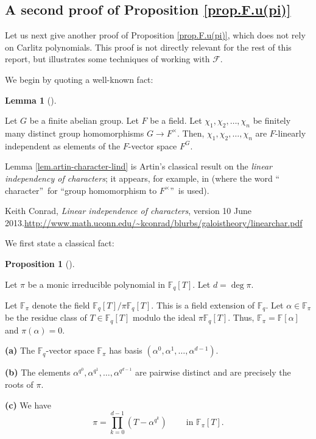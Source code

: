 \documentclass[numbers=enddot,12pt,final,onecolumn,notitlepage]{scrartcl}%
\theoremstyle{definition}
\newtheorem{lem}[theo]{Lemma}
\newenvironment{lemma}[1][]
{\begin{lem}[#1]\begin{leftbar}}
{\end{leftbar}\end{lem}}
\newtheorem{prop}[theo]{Proposition}
\newenvironment{proposition}[1][]
{\begin{prop}[#1]\begin{leftbar}}
{\end{leftbar}\end{prop}}
\newenvironment{noncompile}{}{}
\let\prodnonlimits\prod
\renewcommand{\prod}{\prodnonlimits\limits}
\begin{document}
\subsection{A second proof of Proposition \ref{prop.F.u(pi)}}

Let us next give another proof of Proposition \ref{prop.F.u(pi)}, which does
not rely on Carlitz polynomials. This proof is not directly relevant for the
rest of this report, but illustrates some techniques of working with
$\mathcal{F}$.

\begin{noncompile}
We begin by quoting a well-known fact:

\begin{lemma}
\label{lem.artin-character-lind}Let $G$ be a finite abelian group. Let $F$ be
a field. Let $\chi_{1},\chi_{2},\ldots,\chi_{n}$ be finitely many distinct
group homomorphisms $G\rightarrow F^{\times}$. Then, $\chi_{1},\chi_{2}%
,\ldots,\chi_{n}$ are $F$-linearly independent as elements of the $F$-vector
space $F^{G}$.
\end{lemma}

Lemma \ref{lem.artin-character-lind} is Artin's classical result on the
\textit{linear independency of characters}; it appears, for example, in
\cite[Theorem 2.1]{kc-lind} (where the word \textquotedblleft
character\textquotedblright\ for \textquotedblleft group homomorphism to
$F^{\times}$\textquotedblright\ is used).

Keith Conrad, \textit{Linear independence of characters},
version 10 June 2013.\newline\url{http://www.math.uconn.edu/~kconrad/blurbs/galoistheory/linearchar.pdf}
\end{noncompile}

We first state a classical fact:

\begin{proposition}
\label{prop.F.u(pi).lem1}Let $\pi$ be a monic irreducible polynomial in
$\mathbb{F}_{q}\left[  T\right]  $. Let $d=\deg\pi$.

Let $\mathbb{F}_{\pi}$ denote the field $\mathbb{F}_{q}\left[  T\right]
/\pi\mathbb{F}_{q}\left[  T\right]  $. This is a field extension of
$\mathbb{F}_{q}$. Let $\alpha\in\mathbb{F}_{\pi}$ be the residue class of
$T\in\mathbb{F}_{q}\left[  T\right]  $ modulo the ideal $\pi\mathbb{F}%
_{q}\left[  T\right]  $. Thus, $\mathbb{F}_{\pi}=\mathbb{F}\left[
\alpha\right]  $ and $\pi\left(  \alpha\right)  =0$.

\textbf{(a)} The $\mathbb{F}_{q}$-vector space $\mathbb{F}_{\pi}$ has basis
$\left(  \alpha^{0},\alpha^{1},\ldots,\alpha^{d-1}\right)  $.

\textbf{(b)} The elements $\alpha^{q^{0}},\alpha^{q^{1}},\ldots,\alpha
^{q^{d-1}}$ are pairwise distinct and are precisely the roots of $\pi$.

\textbf{(c)} We have%
\begin{equation}
\pi=\prod_{k=0}^{d-1}\left(  T-\alpha^{q^{k}}\right)
\ \ \ \ \ \ \ \ \ \ \text{in }\mathbb{F}_{\pi}\left[  T\right]  .
\label{eq.prop.F.u(pi).lem1.c}%
\end{equation}

\end{proposition}
\end{document}
